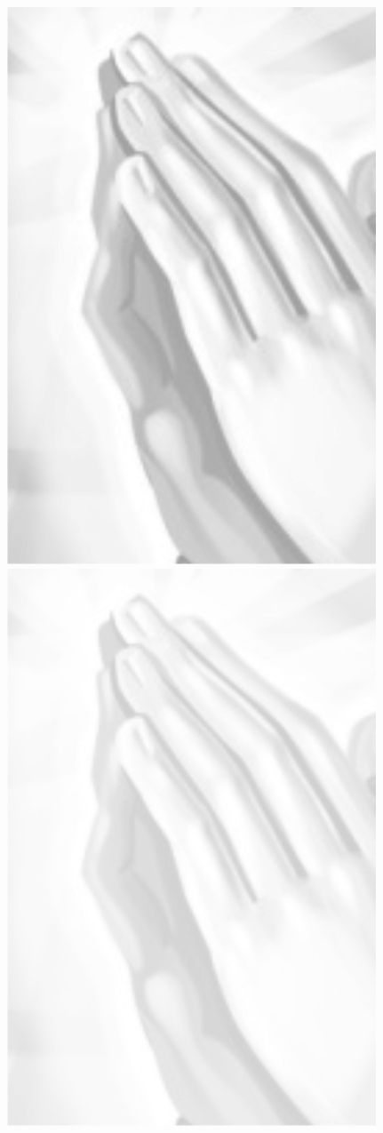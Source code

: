 \begin{figure}
\includegraphics[scale=0.15]{gambar/bersyukur3.png}

\includegraphics[scale=0.15]{gambar/bersyukur4.png}

\end{figure}

